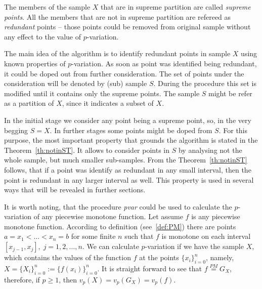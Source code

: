 \documentclass[12pt, a4paper]{article}
\numberwithin{equation}{section}
\begin{document}
The members of the sample $X$ that are in supreme partition are
called \emph{supreme points}. All the members
that are not in supreme partition are refereed as
\emph{redundant} points -- 
those points could be removed from original sample without any effect to 
the value of $p$-variation.

The main idea of the algorithm is 
to identify redundant points in sample $X$ using known properties of
$p$-variation. As soon as point was identified being redundant, it could be 
doped out from further consideration. 
The set of points under the consideration 
will be denoted by (sub) sample $S$.
During the procedure this set is modified until it contains only the 
supreme points. 
The sample $S$ might be refer as a partition of $X$, 
since it indicates a subset of $X$.


In the initial stage we consider any point being a supreme point, 
so, in the very begging $S=X$. In further stages
some points might be doped from $S$.
For this purpose, 
the most important property that grounds
the algorithm is
stated in the Theorem~\ref{th:notinST}.
It allows to consider points in $S$ by analysing
not the whole sample, but much
smaller sub-samples. From the
Theorem~\ref{th:notinST} follows, that 
if a point was identify as redundant in any
small interval, then the point is redundant in
any larger interval as well. 
This property is used in several ways that will be revealed in 
further sections.




It is worth noting, 
that the procedure \emph{pvar} could be used to calculate
the $p$-variation of any piecewise monotone function.
Let assume $f$ is any piecewise monotone function.  
According to definition (see~\ref{def:PM}) 
there are points $a=x_1<\dots<x_n=b$ for some finite $n$ such 
that $f$ is monotone on each interval 
$[x_{j-1},x_j],\;j=1,2,\dots,n$.
We can calculate $p$-variation if we have the sample $X$, 
which contains the values of the function $f$ 
at the points $\{x_{i}\}_{i=0}^{n}$, namely,
$X=\{X_{i}\}_{i=0}^{n}:=\{f(x_{i})\}_{i=0}^{n}$.
It is straight forward to see that 
$f \stackrel{PM}{=} G_X$, 
therefore, if $p \geq 1$, then $v_p(X)=v_p(G_X)=v_p(f)$.
\end{document}
